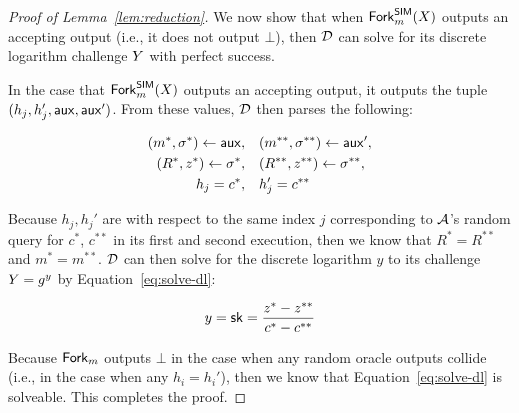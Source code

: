 \begin{proof}[Proof of Lemma~\ref{lem:reduction}]
   We now show that when $\mathsf{Fork}_m^{\mathsf{SIM}}(X)$ outputs an accepting output
   (i.e., it does not output $\bot$),
   then $\mathcal{D}$ can solve for its discrete logarithm challenge $Y$ with
   perfect success.

   In the case that $\mathsf{Fork}_m^{\mathsf{SIM}}(X)$ outputs an accepting output,
   it outputs the tuple $(h_j, h_j', \allowbreak \mathsf{aux}, \mathsf{aux}')$.
   From these values,
   $\mathcal{D}$ then parses the following:

   \begin{align*}
     \begin{split}
       (m^*, \sigma^*)  \gets \mathsf{aux},
       & \quad (m^{**}, \sigma^{**})  \gets \mathsf{aux}', \\
       (R^*, z^*)  \gets \sigma^*,
       & \quad (R^{**}, z^{**})  \gets \sigma^{**}, \\
       h_j = c^*, & \quad h_j'=c^{**}
     \end{split}
   \end{align*}

  Because $h_j, h_j'$ are with respect to the same index $j$ corresponding to
  $\mathcal{A}$'s random query for $c^*$, $c^{**}$ in its first and second execution,
  then we know that $R^{*}=R^{**}$ and $m^{*}=m^{**}$.
   $\mathcal{D}$ can then solve for the discrete logarithm $y$ to its challenge $Y = g^y$
   by Equation~\ref{eq:solve-dl}:

   \begin{equation} \label{eq:solve-dl}
     y = \mathsf{sk} =  \frac{z^* - z^{**}}{c^* - c^{**}}
   \end{equation}


   Because $\mathsf{Fork}_m$ outputs $\bot$ in the case when any random oracle outputs collide (i.e., in the case when any $h_i = h_i'$),
   then we know that Equation~\ref{eq:solve-dl} is solveable.
   This completes the proof.
\end{proof}
